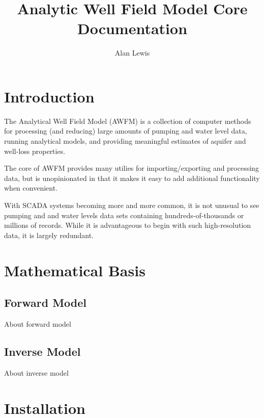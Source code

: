 \documentclass{book}
\author{Alan Lewis}
\title{Analytic Well Field Model Core Documentation}
\begin{document}
\tableofcontents

\chapter*{Introduction} %

The Analytical Well Field Model (AWFM) is a collection of computer methods for processing
(and reducing) large amounts of pumping and water level data, running analytical models,
and providing meaningful estimates of aquifer and well-loss properties.

The core of AWFM provides many utilies for importing/exporting and processing data, but 
is unopinionated in that it makes it easy to add additional functionality when convenient.

With SCADA systems becoming more and more common, it is not unusual to see pumping and 
and water levels data sets containing hundreds-of-thousands or millions of records. While it is
advantageous to begin with such high-resolution data, it is largely redundant. 



\chapter{Mathematical Basis}

\section{Forward Model}
About forward model

\section{Inverse Model}
About inverse model



\chapter{Installation}
\end{document}
